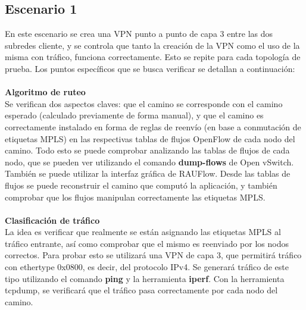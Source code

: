 \subsection{Escenario 1}
En este escenario se crea una VPN punto a punto de capa 3 entre las dos subredes cliente, y se controla que tanto la creación de la VPN como el uso de la misma con tráfico, funciona correctamente. Esto se repite para cada topología de prueba. Los puntos específicos que se busca verificar se detallan a continuación: \\ \\
\textbf{Algoritmo de ruteo} \\
Se verifican dos aspectos claves: que el camino se corresponde con el camino esperado (calculado previamente de forma manual), y que el camino es correctamente instalado en forma de reglas de reenvío (en base a conmutación de etiquetas MPLS) en las respectivas tablas de flujos OpenFlow de cada nodo del camino. Todo esto se puede comprobar analizando las tablas de flujos de cada nodo, que se pueden ver utilizando el comando \textbf{dump-flows} de Open vSwitch. También se puede utilizar la interfaz gráfica de RAUFlow. Desde las tablas de flujos se puede reconstruir el camino que computó la aplicación, y también comprobar que los flujos manipulan correctamente las etiquetas MPLS. \\ \\
\textbf{Clasificación de tráfico} \\
La idea es verificar que realmente se están asignando las etiquetas MPLS al tráfico entrante, así como comprobar que el mismo es reenviado por los nodos correctos. Para probar esto se utilizará una VPN de capa 3, que permitirá tráfico con ethertype 0x0800, es decir, del protocolo IPv4. Se generará tráfico de este tipo utilizando el comando \textbf{ping} y la herramienta \textbf{iperf}. Con la herramienta tcpdump, se verificará que el tráfico pasa correctamente por cada nodo del camino. \\

\begin{table}[ht]
	\caption{Pasos que cumple cada caso en la creación y uso exitoso de un servicio.}
	\centering 
	\label{table:problemas_por_topologia}
\end{table}

